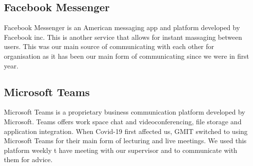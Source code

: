 \subsection{Facebook Messenger}
Facebook Messenger is an American messaging app and platform developed by Facebook inc. This is another service that allows for instant massaging between users. This was our main source of communicating with each other for organisation as it has been our main form of communicating since we were in first year.

\subsection{Microsoft Teams}
Microsoft Teams is a proprietary business communication platform developed by Microsoft. Teams offers work space chat and videoconferencing, file storage and application integration. When Covid-19 first affected us, GMIT switched to using Microsoft Teams for their main form of lecturing and live meetings. We used this platform weekly t have meeting with our supervisor and to communicate with them for advice.




